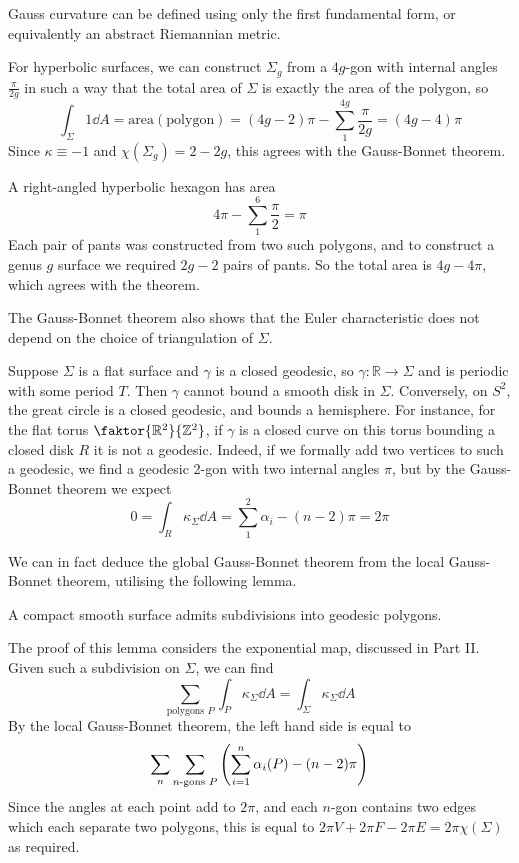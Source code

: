 \begin{remark}
	Gauss curvature can be defined using only the first fundamental form, or equivalently an abstract Riemannian metric.
	
	For hyperbolic surfaces, we can construct \( \Sigma_g \) from a \( 4g \)-gon with internal angles \( \frac{\pi}{2g} \) in such a way that the total area of \( \Sigma \) is exactly the area of the polygon, so
	\[ \int_\Sigma 1 \dd{A} = \mathrm{area}(\mathrm{polygon}) = (4g-2)\pi - \sum_{1}^{4g} \frac{\pi}{2g} = (4g-4)\pi \]
	Since \( \kappa \equiv -1 \) and \( \chi(\Sigma_g) = 2-2g \), this agrees with the Gauss-Bonnet theorem.

	A right-angled hyperbolic hexagon has area
	\[ 4\pi - \sum_{1}^6 \frac{\pi}{2} = \pi \]
	Each pair of pants was constructed from two such polygons, and to construct a genus \( g \) surface we required \( 2g-2 \) pairs of pants.
	So the total area is \( 4g-4\pi \), which agrees with the theorem.

	The Gauss-Bonnet theorem also shows that the Euler characteristic does not depend on the choice of triangulation of \( \Sigma \).

	Suppose \( \Sigma \) is a flat surface and \( \gamma \) is a closed geodesic, so \( \gamma \colon \mathbb R \to \Sigma \) and is periodic with some period \( T \).
	Then \( \gamma \) cannot bound a smooth disk in \( \Sigma \).
	Conversely, on \( S^2 \), the great circle is a closed geodesic, and bounds a hemisphere.
	For instance, for the flat torus \( \faktor{\mathbb R^2}{\mathbb Z^2} \), if \( \gamma \) is a closed curve on this torus bounding a closed disk \( R \) it is not a geodesic.
	Indeed, if we formally add two vertices to such a geodesic, we find a geodesic 2-gon with two internal angles \( \pi \), but by the Gauss-Bonnet theorem we expect
	\[ 0 = \int_R \kappa_\Sigma \dd{A} = \sum_1^2 \alpha_i - (n-2)\pi = 2\pi \]
\end{remark}
We can in fact deduce the global Gauss-Bonnet theorem from the local Gauss-Bonnet theorem, utilising the following lemma.
\begin{lemma}
	A compact smooth surface admits subdivisions into geodesic polygons.
\end{lemma}
The proof of this lemma considers the exponential map, discussed in Part II.
Given such a subdivision on \( \Sigma \), we can find
\[ \sum_{\text{polygons } P} \int_P \kappa_\Sigma \dd{A} = \int_\Sigma \kappa_\Sigma \dd{A} \]
By the local Gauss-Bonnet theorem, the left hand side is equal to
\[ \sum_n \sum_{n\text{-gons } P} \qty(\sum_{i=1}^n \alpha_i(P) - (n-2)\pi) \]
Since the angles at each point add to \( 2\pi \), and each \( n \)-gon contains two edges which each separate two polygons, this is equal to \( 2\pi V + 2 \pi F - 2\pi E = 2\pi\chi(\Sigma) \) as required.

